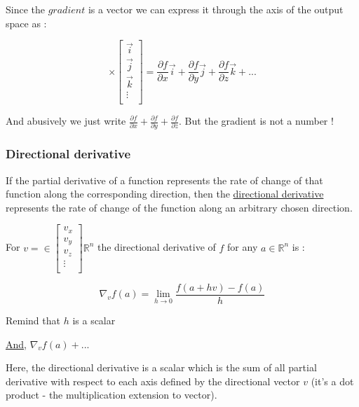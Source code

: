 \documentclass[12pt]{article}
\begin{document}
Since the $gradient$ is a vector we can express it through the axis of the output space as :

\begin{equation*}
[\frac{\partial{f}}{\partial{x}}, \frac{\partial{f}}{\partial{y}}, \frac{\partial{f}}{\partial{z}},...] 
\times
\begin{bmatrix}
    \vec{i} \\
    \vec{j} \\
    \vec{k} \\
    \vdots \\
\end{bmatrix}
= \frac{\partial{f}}{\partial{x}}\vec{i} + \frac{\partial{f}}{\partial{y}}\vec{j} + \frac{\partial{f}}{\partial{z}}\vec{k} + ...
\end{equation*}

And abusively we just write $\frac{\partial{f}}{\partial{x}} + \frac{\partial{f}}{\partial{y}} + \frac{\partial{f}}{\partial{z}}$. But the gradient is not a number !


\subsubsection{Directional derivative}

If the partial derivative of a function represents the rate of change of that function along the corresponding direction, then the \href{https://www.youtube.com/watch?v=N_ZRcLheNv0&ab_channel=KhanAcademy}{directional derivative} represents the rate of change of the function along an arbitrary chosen direction.

For 
$v= \in \begin{bmatrix}
    v_x \\
    v_y \\
    v_z \\
    \vdots \\
\end{bmatrix} \mathbb{R}^n$ 
the directional derivative of $f$ for any $a \in \mathbb{R}^n$ is :

$$
\nabla_{v}f(a) = \lim_{h \rightarrow 0} \frac{f(a+hv)-f(a)}{h}
$$

Remind that $h$ is a scalar

\href{ttps://en.wikipedia.org/wiki/Directional_derivative}{And}, $\nabla_{v}f(a) + ...$

Here, the directional derivative is a scalar which is the sum of all partial derivative with respect to each axis defined by the directional vector $v$ (it's a dot product - the multiplication extension to vector).
\end{document}
